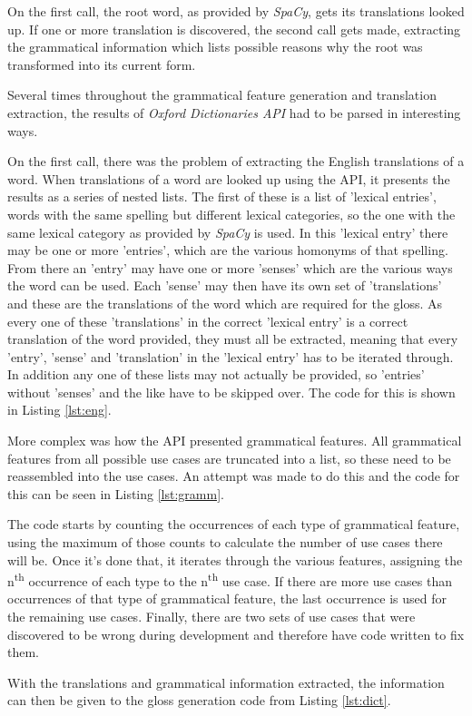 On the first call, the root word, as provided by \textit{SpaCy}, gets its translations looked up. If one or more translation is discovered, the second call gets made, extracting the grammatical information which lists possible reasons why the root was transformed into its current form.

Several times throughout the grammatical feature generation and translation extraction, the results of \textit{Oxford Dictionaries API} had to be parsed in interesting ways. 

On the first call, there was the problem of extracting the English translations of a word. When translations of a word are looked up using the API, it presents the results as a series of nested lists.  The first of these is a list of 'lexical entries', words with the same spelling but different lexical categories, so the one with the same lexical category as provided by \textit{SpaCy} is used. In this 'lexical entry' there may be one or more 'entries', which are the various homonyms of that spelling. From there an 'entry' may have one or more 'senses' which are the various ways the word can be used. Each 'sense' may then have its own set of 'translations' and these are the translations of the word which are required for the gloss. As every one of these 'translations' in the correct 'lexical entry' is a correct translation of the word provided, they must all be extracted, meaning that every 'entry', 'sense' and 'translation' in the 'lexical entry' has to be iterated through. In addition any one of these lists may not actually be provided, so 'entries' without 'senses' and the like have to be skipped over. The code for this is shown in Listing \ref{lst:eng}. 



More complex was how the API presented grammatical features. All grammatical features from all possible use cases are truncated into a list, so these need to be reassembled into the use cases. An attempt was made to do this and the code for this can be seen in Listing \ref{lst:gramm}.



The code starts by counting the occurrences of each type of grammatical feature, using the maximum of those counts to calculate the number of use cases there will be. Once it's done that, it iterates through the various features, assigning the n\textsuperscript{th} occurrence of each type to the n\textsuperscript{th} use case. If there are more use cases than occurrences of that type of grammatical feature, the last occurrence is used for the remaining use cases. Finally, there are two sets of use cases that were discovered to be wrong during development and therefore have code written to fix them. 

With the translations and grammatical information extracted, the information can then be given to the gloss generation code from Listing \ref{lst:dict}. 
